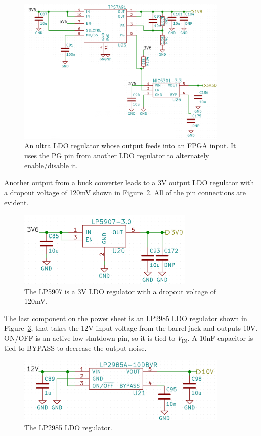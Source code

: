 \begin{figure}[h]
  \centering
  \includegraphics[width=0.9\textwidth]{data/ldo-ldo-connection.png}
  \caption{An ultra LDO regulator whose output feeds into an FPGA input. It uses the PG
    pin from another LDO regulator to alternately enable/disable it.}
  \label{fig:ldo-ldo-connection}
\end{figure}

Another output from a buck converter leads to a 3V output LDO regulator with a dropout voltage of
120mV shown in Figure~\ref{fig:lp5907}. All of the pin connections are evident.

\begin{figure}[h]
  \centering
  \includegraphics[width=0.75\textwidth]{data/lp5907.png}
  \caption{The LP5907 is a 3V LDO regulator with a dropout voltage of 120mV.}
  \label{fig:lp5907}
\end{figure}

The last component on the power sheet is an
\href{http://www.ti.com/lit/ds/symlink/lp2985.pdf}{LP2985} LDO regulator shown in
Figure~\ref{fig:lp2985}, that takes the 12V input voltage from the barrel jack and outputs
10V. ON/OFF is an active-low shutdown pin, so it is tied to $V_{\text{IN}}$. A 10nF capacitor is
tied to BYPASS to decrease the output noise.

\begin{figure}[h]
  \centering
  \includegraphics[width=0.9\textwidth]{data/lp2985.png}
  \caption{The LP2985 LDO regulator.}
  \label{fig:lp2985}
\end{figure}